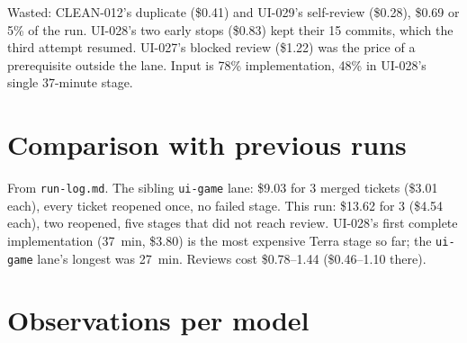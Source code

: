 \documentclass[11pt,a4paper]{article}
\begin{document}
\begin{center}
\end{center}

Wasted: CLEAN-012's duplicate (\$0.41) and UI-029's self-review (\$0.28), \$0.69 or 5\% of the run.
UI-028's two early stops (\$0.83) kept their 15 commits, which the third attempt resumed. UI-027's
blocked review (\$1.22) was the price of a prerequisite outside the lane. Input is 78\%
implementation, 48\% in UI-028's single 37-minute stage.

\section*{Comparison with previous runs}

From \texttt{run-log.md}. The sibling \texttt{ui-game} lane: \$9.03 for 3 merged tickets (\$3.01
each), every ticket reopened once, no failed stage. This run: \$13.62 for 3 (\$4.54 each), two
reopened, five stages that did not reach review. UI-028's first complete implementation (37~min,
\$3.80) is the most expensive Terra stage so far; the \texttt{ui-game} lane's longest was 27~min.
Reviews cost \$0.78--1.44 (\$0.46--1.10 there).

\section*{Observations per model}
\end{document}
